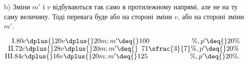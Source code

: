 b) Зміни $m'$ і $v$ відбуваються так само в протилежному напрямі,
але не на ту саму величину. Тоді перевага буде або на
стороні зміни $v$, або на стороні зміни $m'$.
\begin{center}
$\phantom{II}\text{I.} 80 c \dplus{} 20 v \dplus{} 20 m; m' \deq{} 100\phantom{\sfrac{3}{7}}\%, p' \deq{} 20\%$
$\phantom{I}\text{II.}72 c \dplus{} 28 v \dplus{} 20 m; m' \deq{} \phantom{0}71\sfrac{3}{7}\%, p' \deq{} 20\%$
$\text{III.} 84 c \dplus{} 16 v \dplus{} 20 m; m' \deq{} 125\phantom{\sfrac{3}{7}}\%, p' \deq{} 20\%.$
\end{center}
